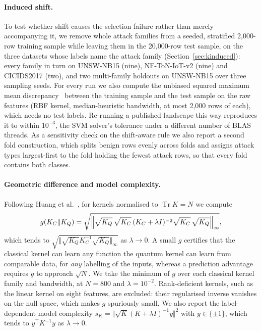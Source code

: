 \documentclass[preprint,11pt]{elsarticle}
\begin{document}
\paragraph{Induced shift.} To test whether shift causes the selection failure rather than merely
accompanying it, we remove whole attack families from a seeded, stratified 2{,}000-row training sample
while leaving them in the 20{,}000-row test sample, on the three datasets whose labels name the attack
family (Section~\ref{sec:kinduced}): every family in turn on UNSW-NB15 (nine), NF-ToN-IoT-v2 (nine) and
CICIDS2017 (two), and two multi-family holdouts on UNSW-NB15 over three sampling seeds. For every run we
also compute the unbiased squared maximum mean discrepancy~\cite{gretton2012kernel} between the training
sample and the test sample on the raw features (RBF kernel, median-heuristic bandwidth, at most 2{,}000
rows of each), which needs no test labels. Re-running a published landscape this way reproduces it to
within $10^{-3}$, the SVM solver's tolerance under a different number of BLAS threads. As a sensitivity
check on the shift-aware rule we also report a second fold construction, which splits benign rows evenly
across folds and assigns attack types largest-first to the fold holding the fewest attack rows, so that
every fold contains both classes.

\paragraph{Geometric difference and model complexity.} Following Huang et al.~\cite{huang2021power}, for
kernels normalised to $\operatorname{Tr}K=N$ we compute
\[
g(K_C\Vert K_Q)=\sqrt{\Bigl\Vert\sqrt{K_Q}\,\sqrt{K_C}\,(K_C+\lambda I)^{-2}\sqrt{K_C}\,\sqrt{K_Q}\Bigr\Vert_{\infty}},
\]
which tends to $\sqrt{\Vert\sqrt{K_Q}K_C^{-1}\sqrt{K_Q}\Vert_{\infty}}$ as $\lambda\to 0$. A small $g$
certifies that the classical kernel can learn any function the quantum kernel can learn from comparable
data, for \emph{any} labelling of the inputs, whereas a prediction advantage requires $g$ to approach
$\sqrt{N}$. We take the minimum of $g$ over each classical kernel family and bandwidth, at $N=800$ and
$\lambda=10^{-2}$. Rank-deficient kernels, such as the linear kernel on eight features, are excluded:
their regularised inverse vanishes on the null space, which makes $g$ spuriously small. We also report
the label-dependent model complexity $s_K=\Vert\sqrt{K}(K+\lambda I)^{-1}y\Vert^{2}$ with $y\in\{\pm1\}$,
which tends to $y^{\top}K^{-1}y$ as $\lambda\to 0$.
\end{document}
